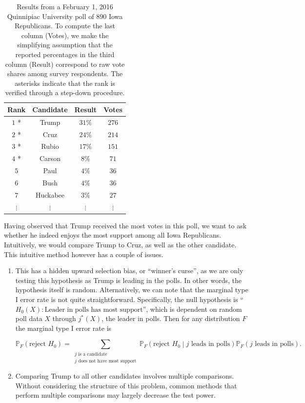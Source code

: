 \documentclass[11pt]{article}
\newcommand{\PP}{\mathbb{P}}
\begin{document}
\begin{table}[htbp]
\begin{center}
\begin{tabular}{c c c c}
	\hline
	Rank & Candidate & Result & Votes \\
	\hline
	$1$ * & Trump & $31\%$ & $276$ \\
	$2$ * & Cruz & $24\%$ & $214$ \\
	$3$ * & Rubio & $17\%$ & $151$ \\
	$4$ * & Carson & $8\%$ & $71$ \\
	$5$ & Paul & $4\%$ & $36$ \\
	$6$ & Bush & $4\%$ & $36$ \\
	$7$ & Huckabee & $3\%$ & $27$ \\
	$\vdots$ & $\vdots$ & $\vdots $ & $\vdots$ \\
	\hline
\end{tabular}
\end{center}
\caption{Results from a February 1, 2016 Quinnipiac University poll of $890$ Iowa Republicans. To compute the last column (Votes), we make the simplifying assumption that the reported percentages in the third column (Result) correspond to raw vote shares among survey respondents. The asterisks indicate that the rank is verified through a step-down procedure.}
\label{tbl:poll}
\end{table}

Having observed that Trump received the most votes in this poll, we want to ask whether he indeed enjoys the most support among all Iowa Republicans. Intuitively, we would compare Trump to Cruz, as well as the other candidate. This intuitive method however has a couple of issues.

\begin{enumerate}

\item This has a hidden upward selection bias, or ``winner's curse'', as we are only testing this hypothesis as Trump is leading in the polls. In other words, the hypothesis itself is random. Alternatively, we can note that the marginal type I error rate is not quite straightforward. Specifically, the null hypothesis is ``$H_0 \left(X\right): \text{Leader in polls has most support}$'', which is dependent on random poll data $X$ through $j^*\left(X\right)$, the leader in polls. Then for any distribution $F$ the marginal type I error rate is

\begin{equation}
\PP_F\left(\text{reject } H_0\right) = \sum_{\substack{j \text{ is a candidate} \\ j \text{ does not have most support}}} \PP_F\left(\text{reject } H_0 \middle| j \text{ leads in polls}\right) \PP_F \left(j \text{ leads in polls}\right).
\label{eqn:marginal_error}
\end{equation}

\item Comparing Trump to all other candidates involves multiple comparisons. Without considering the structure of this problem, common methods that perform multiple comparisons may largely decrease the test power.

\end{enumerate}
\end{document}
